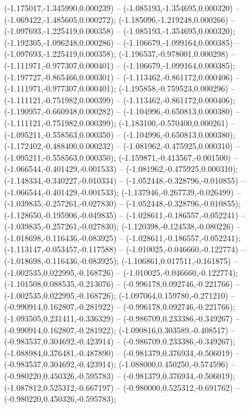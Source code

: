  (-1.175017,-1.345990,0.000239) -- (-1.085193,-1.354695,0.000320) -- (-1.069422,-1.485605,0.000272);
 (-1.185096,-1.219248,0.000266) -- (-1.097693,-1.225419,0.000358) -- (-1.085193,-1.354695,0.000320);
 (-1.192305,-1.096248,0.000286) -- (-1.106679,-1.099164,0.000385) -- (-1.097693,-1.225419,0.000358);
 (-1.196537,-0.978001,0.000298) -- (-1.111971,-0.977307,0.000401) -- (-1.106679,-1.099164,0.000385);
 (-1.197727,-0.865466,0.000301) -- (-1.113462,-0.861172,0.000406) -- (-1.111971,-0.977307,0.000401);
 (-1.195858,-0.759523,0.000296) -- (-1.111121,-0.751982,0.000399) -- (-1.113462,-0.861172,0.000406);
 (-1.190957,-0.660948,0.000282) -- (-1.104996,-0.650813,0.000380) -- (-1.111121,-0.751982,0.000399);
 (-1.183100,-0.570400,0.000261) -- (-1.095211,-0.558563,0.000350) -- (-1.104996,-0.650813,0.000380);
 (-1.172402,-0.488400,0.000232) -- (-1.081962,-0.475925,0.000310) -- (-1.095211,-0.558563,0.000350);
 (-1.159871,-0.413567,-0.001500) -- (-1.066544,-0.401429,-0.001533) -- (-1.081962,-0.475925,0.000310);
 (-1.148334,-0.340227,-0.010334) -- (-1.052448,-0.328796,-0.010855) -- (-1.066544,-0.401429,-0.001533);
 (-1.137946,-0.267739,-0.026499) -- (-1.039835,-0.257261,-0.027830) -- (-1.052448,-0.328796,-0.010855);
 (-1.128650,-0.195906,-0.049835) -- (-1.028611,-0.186557,-0.052241) -- (-1.039835,-0.257261,-0.027830);
 (-1.120398,-0.124538,-0.080226) -- (-1.018698,-0.116436,-0.083925) -- (-1.028611,-0.186557,-0.052241);
 (-1.113147,-0.053457,-0.117588) -- (-1.010025,-0.046660,-0.122774) -- (-1.018698,-0.116436,-0.083925);
 (-1.106861,0.017511,-0.161875) -- (-1.002535,0.022995,-0.168726) -- (-1.010025,-0.046660,-0.122774);
 (-1.101508,0.088535,-0.213076) -- (-0.996178,0.092746,-0.221766) -- (-1.002535,0.022995,-0.168726);
 (-1.097064,0.159780,-0.271210) -- (-0.990914,0.162807,-0.281922) -- (-0.996178,0.092746,-0.221766);
 (-1.093505,0.231411,-0.336329) -- (-0.986709,0.233386,-0.349267) -- (-0.990914,0.162807,-0.281922);
 (-1.090816,0.303589,-0.408517) -- (-0.983537,0.304692,-0.423914) -- (-0.986709,0.233386,-0.349267);
 (-1.088984,0.376481,-0.487890) -- (-0.981379,0.376934,-0.506019) -- (-0.983537,0.304692,-0.423914);
 (-1.088000,0.450250,-0.574596) -- (-0.980220,0.450326,-0.595783) -- (-0.981379,0.376934,-0.506019);
 (-1.087812,0.525312,-0.667197) -- (-0.980000,0.525312,-0.691762) -- (-0.980220,0.450326,-0.595783);
